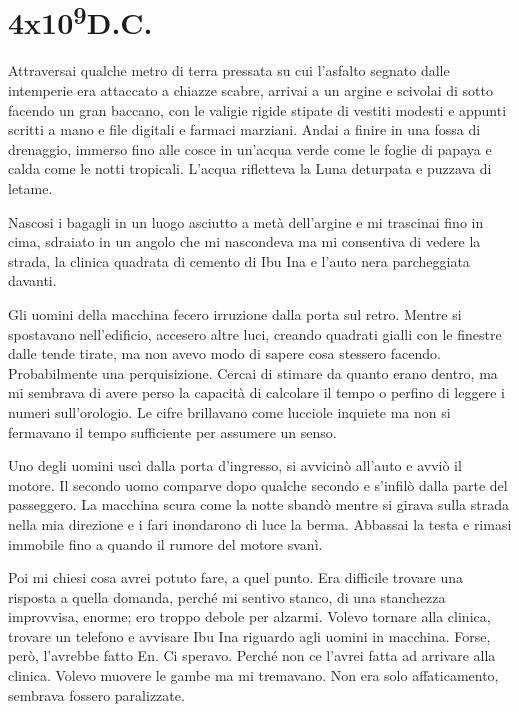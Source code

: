 \chapter{4x10\textsuperscript{9}D.C.}\label{4x10^9-4}

\hfill\break

Attraversai qualche metro di terra pressata su cui l'asfalto segnato
dalle intemperie era attaccato a chiazze scabre, arrivai a un argine e
scivolai di sotto facendo un gran baccano, con le valigie rigide stipate
di vestiti modesti e appunti scritti a mano e file digitali e farmaci
marziani. Andai a finire in una fossa di drenaggio, immerso fino alle
cosce in un'acqua verde come le foglie di papaya e calda come le notti
tropicali. L'acqua rifletteva la Luna deturpata e puzzava di letame.

Nascosi i bagagli in un luogo asciutto a metà dell'argine e mi trascinai
fino in cima, sdraiato in un angolo che mi nascondeva ma mi consentiva
di vedere la strada, la clinica quadrata di cemento di Ibu Ina e l'auto
nera parcheggiata davanti.

Gli uomini della macchina fecero irruzione dalla porta sul retro. Mentre
si spostavano nell'edificio, accesero altre luci, creando quadrati
gialli con le finestre dalle tende tirate, ma non avevo modo di sapere
cosa stessero facendo. Probabilmente una perquisizione. Cercai di
stimare da quanto erano dentro, ma mi sembrava di avere perso la
capacità di calcolare il tempo o perfino di leggere i numeri
sull'orologio. Le cifre brillavano come lucciole inquiete ma non si
fermavano il tempo sufficiente per assumere un senso.

Uno degli uomini uscì dalla porta d'ingresso, si avvicinò all'auto e
avviò il motore. Il secondo uomo comparve dopo qualche secondo e
s'infilò dalla parte del passeggero. La macchina scura come la notte
sbandò mentre si girava sulla strada nella mia direzione e i fari
inondarono di luce la berma. Abbassai la testa e rimasi immobile fino a
quando il rumore del motore svanì.

Poi mi chiesi cosa avrei potuto fare, a quel punto. Era difficile
trovare una risposta a quella domanda, perché mi sentivo stanco, di una
stanchezza improvvisa, enorme; ero troppo debole per alzarmi. Volevo
tornare alla clinica, trovare un telefono e avvisare Ibu Ina riguardo
agli uomini in macchina. Forse, però, l'avrebbe fatto En. Ci speravo.
Perché non ce l'avrei fatta ad arrivare alla clinica. Volevo muovere le
gambe ma mi tremavano. Non era solo affaticamento, sembrava fossero
paralizzate.

